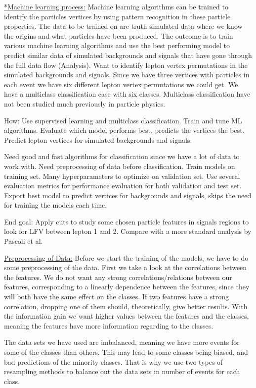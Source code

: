 \documentclass[a4paper, american, 12pt]{report}
\begin{document}
	
	\underline{*Machine learning process:}
	Machine learning algorithms can be trained to identify the particles vertices by using pattern recognition in these particle properties. The data to be trained on are truth simulated data where we know the origins and what particles have been produced. The outcome is to train various machine learning algorithms and use the best performing model to predict similar data of simulated backgrounds and signals that have gone through the full data flow (Analysis). Want to identify lepton vertex permutations in the simulated backgrounds and signals. Since we have three vertices with particles in each event we have six different lepton vertex permutations we could get. We have a multiclass classification case with six classes. Multiclass classification have not been studied much previously in particle physics. 
	
	How: Use supervised learning and multiclass classification. Train and tune ML algorithms. Evaluate which model performs best, predicts the vertices the best. Predict lepton vertices for simulated backgrounds and signals.
	
	Need good and fast algorithms for classification since we have a lot of data to work with. Need preprocessing of data before classification. Train models on training set. Many hyperparameters to optimize on validation set. Use several evaluation metrics for performance evaluation for both validation and test set. Export best model to predict vertices for backgrounds and signals, skips the need for training the models each time.
	
	End goal: Apply cuts to study some chosen particle features in signals regions to look for LFV between lepton 1 and 2. Compare with a more standard analysis by Pascoli et al.
	
	
	\underline{Preprocessing of Data:}
	Before we start the training of the models, we have to do some preprocessing of the data. First we take a look at the correlations between the features. We do not want any strong correlations/relations between our features, corresponding to a linearly dependence between the features, since they will both have the same effect on the classes. If two features have a strong correlation, dropping one of them should, theoretically, give better results. With the information gain we want higher values between the features and the classes, meaning the features have more information regarding to the classes.
	
	The data sets we have used are imbalanced, meaning we have more events for some of the classes than others. This may lead to some classes being biased, and bad predictions of the minority classes. That is why we use two types of resampling methods to balance out the data sets in number of events for each class.
	
\end{document}
